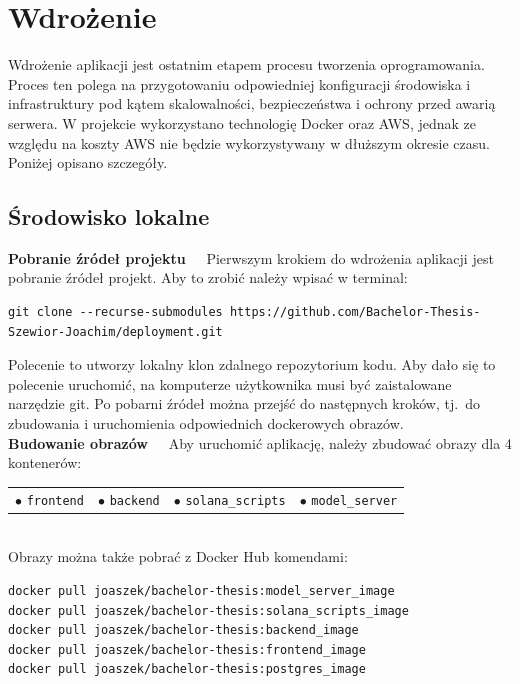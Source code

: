 \chapter{Wdrożenie}
Wdrożenie aplikacji jest ostatnim etapem procesu tworzenia oprogramowania. Proces ten polega na przygotowaniu odpowiedniej konfiguracji środowiska i infrastruktury pod kątem skalowalności, bezpieczeństwa i ochrony przed awarią serwera. W projekcie wykorzystano technologię Docker oraz AWS, jednak ze względu na koszty AWS nie będzie wykorzystywany w dłuższym okresie czasu. Poniżej opisano szczegóły.

\section{Środowisko lokalne}
\textbf{Pobranie źródeł projektu~~} 
Pierwszym krokiem do wdrożenia aplikacji jest pobranie źródeł projekt. Aby to zrobić należy wpisać w terminal:
\begin{lstlisting}[basicstyle=\footnotesize\ttfamily]
git clone --recurse-submodules https://github.com/Bachelor-Thesis-Szewior-Joachim/deployment.git
\end{lstlisting}
Polecenie to utworzy lokalny klon zdalnego repozytorium kodu. Aby dało się to polecenie uruchomić, na komputerze użytkownika musi być zaistalowane narzędzie git.
Po pobarni źródeł można przejść do następnych kroków, tj.\ do zbudowania i uruchomienia odpowiednich dockerowych obrazów.\\[-10pt]

\noindent \textbf{Budowanie obrazów~~}
Aby uruchomić aplikację, należy zbudować obrazy dla 4 kontenerów:

\noindent
\begin{tabularx}{\linewidth}{XXXX}
$\bullet$ \texttt{frontend} &
$\bullet$  \texttt{backend} &
$\bullet$ \texttt{solana\_scripts} &
$\bullet$ \texttt{model\_server} 
\end{tabularx}\\[-10pt]

\noindent 
Obrazy można także pobrać z Docker Hub komendami:
\begin{lstlisting}[basicstyle=\footnotesize\ttfamily]
docker pull joaszek/bachelor-thesis:model_server_image
docker pull joaszek/bachelor-thesis:solana_scripts_image
docker pull joaszek/bachelor-thesis:backend_image
docker pull joaszek/bachelor-thesis:frontend_image
docker pull joaszek/bachelor-thesis:postgres_image
\end{lstlisting}

